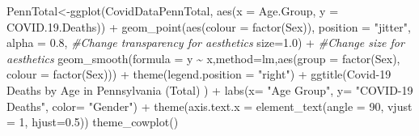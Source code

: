 \documentclass[
]{article}
\newenvironment{Shaded}{\begin{snugshade}}{\end{snugshade}}
\newcommand{\AttributeTok}[1]{\textcolor[rgb]{0.77,0.63,0.00}{#1}}
\newcommand{\CommentTok}[1]{\textcolor[rgb]{0.56,0.35,0.01}{\textit{#1}}}
\newcommand{\DecValTok}[1]{\textcolor[rgb]{0.00,0.00,0.81}{#1}}
\newcommand{\FloatTok}[1]{\textcolor[rgb]{0.00,0.00,0.81}{#1}}
\newcommand{\FunctionTok}[1]{\textcolor[rgb]{0.00,0.00,0.00}{#1}}
\newcommand{\NormalTok}[1]{#1}
\newcommand{\OtherTok}[1]{\textcolor[rgb]{0.56,0.35,0.01}{#1}}
\newcommand{\SpecialCharTok}[1]{\textcolor[rgb]{0.00,0.00,0.00}{#1}}
\newcommand{\StringTok}[1]{\textcolor[rgb]{0.31,0.60,0.02}{#1}}
\begin{document}
\begin{Shaded}
\begin{Highlighting}[]
\NormalTok{PennTotal}\OtherTok{\textless{}{-}}\FunctionTok{ggplot}\NormalTok{(CovidDataPennTotal, }\FunctionTok{aes}\NormalTok{(}\AttributeTok{x =}\NormalTok{ Age.Group, }\AttributeTok{y =}\NormalTok{ COVID.}\FloatTok{19.}\NormalTok{Deaths)) }\SpecialCharTok{+}
  \FunctionTok{geom\_point}\NormalTok{(}\FunctionTok{aes}\NormalTok{(}\AttributeTok{colour =} \FunctionTok{factor}\NormalTok{(Sex)), }
             \AttributeTok{position =} \StringTok{"jitter"}\NormalTok{, }
             \AttributeTok{alpha =} \FloatTok{0.8}\NormalTok{,     }\CommentTok{\#Change transparency for aesthetics}
             \AttributeTok{size=}\FloatTok{1.0}\NormalTok{) }\SpecialCharTok{+}      \CommentTok{\#Change size for aesthetics}
  \FunctionTok{geom\_smooth}\NormalTok{(}\AttributeTok{formula =}\NormalTok{ y }\SpecialCharTok{\textasciitilde{}}\NormalTok{ x,}\AttributeTok{method=}\StringTok{\textquotesingle{}lm\textquotesingle{}}\NormalTok{,}\FunctionTok{aes}\NormalTok{(}\AttributeTok{group =} \FunctionTok{factor}\NormalTok{(Sex), }
                              \AttributeTok{colour =} \FunctionTok{factor}\NormalTok{(Sex))) }\SpecialCharTok{+} 
  \FunctionTok{theme}\NormalTok{(}\AttributeTok{legend.position =} \StringTok{"right"}\NormalTok{) }\SpecialCharTok{+} 
  \FunctionTok{ggtitle}\NormalTok{(}\StringTok{\textquotesingle{}Covid{-}19 Deaths by Age in Pennsylvania (Total) \textquotesingle{}}\NormalTok{) }\SpecialCharTok{+}
  \FunctionTok{labs}\NormalTok{(}\AttributeTok{x=} \StringTok{"Age Group"}\NormalTok{, }\AttributeTok{y=} \StringTok{"COVID{-}19 Deaths"}\NormalTok{, }\AttributeTok{color=} \StringTok{"Gender"}\NormalTok{) }\SpecialCharTok{+}
  \FunctionTok{theme}\NormalTok{(}\AttributeTok{axis.text.x =} \FunctionTok{element\_text}\NormalTok{(}\AttributeTok{angle =} \DecValTok{90}\NormalTok{, }\AttributeTok{vjust =} \DecValTok{1}\NormalTok{, }\AttributeTok{hjust=}\FloatTok{0.5}\NormalTok{))}
  \FunctionTok{theme\_cowplot}\NormalTok{()}
\end{Highlighting}
\end{Shaded}
\end{document}
